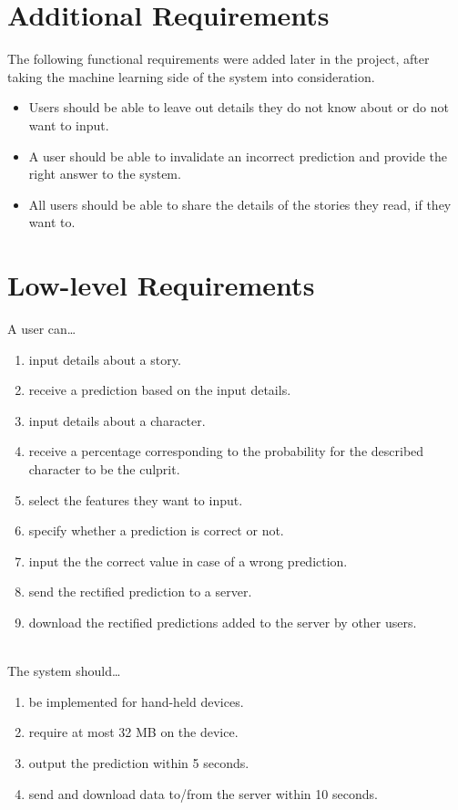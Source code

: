 \documentclass{mproj}
\begin{document}
\section{Additional Requirements}
	
The following functional requirements were added later in the project, after taking the machine learning side of the system into consideration.
\begin{itemize}[topsep=0pt]
\item Users should be able to leave out details they do not know about or do not want to input.
\item A user should be able to invalidate an incorrect prediction and provide the right answer to the system. 
\item All users should be able to share the details of the stories they read, if they want to.
\end{itemize}

\section{Low-level Requirements}\label{requirements}
	
A user can\ldots
\begin{enumerate}[topsep=0pt]\label{user_stories}
	\item input details about a story.
	\item receive a prediction based on the input details.
	\item input details about a character.
	\item receive a percentage corresponding to the probability for the described character to be the culprit.
	\item select the features they want to input.
	\item specify whether a prediction is correct or not.
	\item input the the correct value in case of a wrong prediction.
	\item send the rectified prediction to a server.
	\item download the rectified predictions added to the server by other users. \\\\
\end{enumerate}

The system should\ldots
\begin{enumerate}[topsep=0pt]\label{constraints}
	\item be implemented for hand-held devices.
	\item require at most 32 MB on the device.
	\item output the prediction within 5 seconds.
	\item send and download data to/from the server within 10 seconds.
\end{enumerate}
\end{document}
